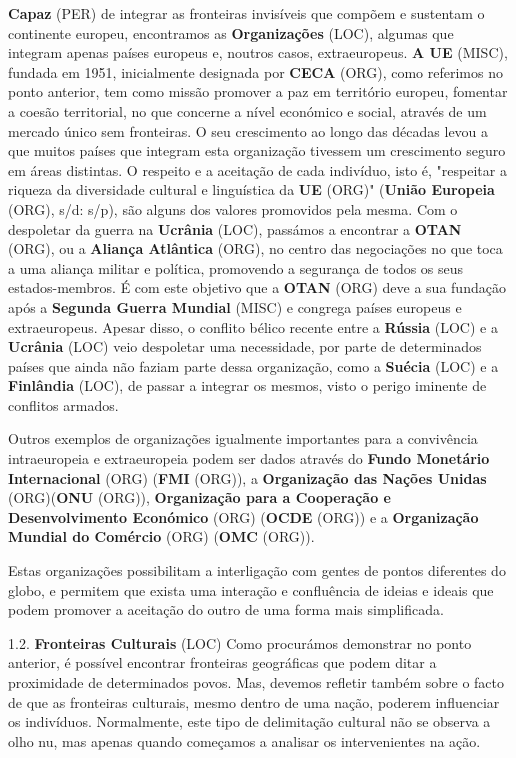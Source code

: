 \documentclass[12pt,a4paper]{article}
\begin{document}
\textbf{Capaz} (PER) de integrar as fronteiras invisíveis que compõem e sustentam o continente europeu, encontramos as \textbf{Organizações} (LOC), algumas que integram apenas países europeus e, noutros  casos,  extraeuropeus.  \textbf{A  UE} (MISC),  fundada  em  1951,  inicialmente  designada  por \textbf{CECA} (ORG), como referimos no ponto anterior, tem como missão promover a paz em território europeu,  fomentar  a  coesão  territorial,  no  que  concerne  a  nível  económico  e  social, através de um  mercado  único sem  fronteiras. O  seu crescimento  ao longo das décadas levou a que muitos países que integram esta organização tivessem um crescimento seguro em áreas distintas. O respeito e a aceitação de cada indivíduo, isto é, "respeitar a riqueza da diversidade cultural e linguística da  \textbf{UE} (ORG)" (\textbf{União Europeia} (ORG), s/d: s/p), são alguns dos valores  promovidos  pela  mesma.  Com  o  despoletar  da  guerra  na  \textbf{Ucrânia} (LOC),  passámos  a encontrar a \textbf{OTAN} (ORG), ou a \textbf{Aliança Atlântica} (ORG), no centro das negociações no que toca a uma aliança militar e política, promovendo a segurança de todos os seus estados-membros. É com este objetivo que a \textbf{OTAN} (ORG) deve a sua fundação após a \textbf{Segunda Guerra Mundial} (MISC) e congrega países europeus e extraeuropeus. Apesar disso, o conflito bélico recente entre a \textbf{Rússia} (LOC) e a \textbf{Ucrânia} (LOC) veio  despoletar uma necessidade, por parte de determinados países que ainda não faziam parte dessa organização, como a \textbf{Suécia} (LOC) e a \textbf{Finlândia} (LOC), de passar a integrar os mesmos, visto o perigo iminente de conflitos armados.

Outros  exemplos  de  organizações  igualmente  importantes  para  a  convivência intraeuropeia e extraeuropeia podem ser dados através do \textbf{Fundo Monetário Internacional} (ORG) (\textbf{FMI} (ORG)),  a  \textbf{Organização  das  Nações  Unidas} (ORG)(\textbf{ONU} (ORG)),  \textbf{Organização  para  a  Cooperação  e Desenvolvimento Económico} (ORG) (\textbf{OCDE} (ORG)) e a \textbf{Organização Mundial do Comércio} (ORG) (\textbf{OMC} (ORG)).

Estas organizações possibilitam a interligação com gentes de pontos diferentes do globo, e permitem que exista uma interação e confluência de ideias e ideais que podem promover a aceitação do outro de uma forma mais simplificada.

1.2. \textbf{Fronteiras Culturais} (LOC) Como procurámos demonstrar no ponto anterior, é possível encontrar fronteiras geográficas que podem ditar a proximidade de determinados povos. Mas, devemos refletir também  sobre  o  facto  de  que  as  fronteiras  culturais,  mesmo  dentro  de  uma  nação, poderem influenciar os indivíduos. Normalmente, este tipo de delimitação cultural não se observa a olho nu, mas apenas quando começamos a analisar os intervenientes na ação.
\end{document}
